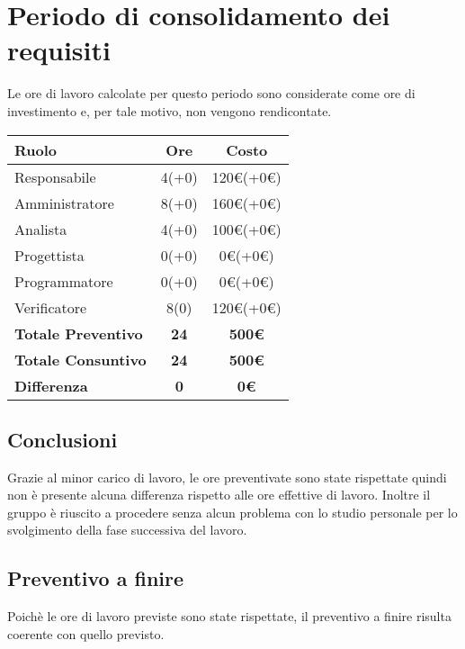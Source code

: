 {\section{Periodo di consolidamento dei requisiti}\label{ConsuntivoPeriodoDiConsolidamentoDeiRequisiti}
Le ore di lavoro calcolate per questo periodo sono considerate come ore di investimento e, per tale motivo, non vengono rendicontate.

\quad
\def\tabularxcolumn#1{m{#1}}
{
	\begin{center}
		\renewcommand{\arraystretch}{1.4}
		\begin{tabularx}{10cm}{|X|c|c|}
			\hline
			\rowcolor{airforceblue}
			\textbf{Ruolo} & \textbf{Ore} & \textbf{Costo}\\
			\hline
			Responsabile & 4(+0) & 120\euro(+0\euro)\\
			\hline
			Amministratore & 8(+0) & 160\euro(+0\euro)\\
			\hline
			Analista & 4(+0) & 100\euro(+0\euro)\\
			\hline
			Progettista & 0(+0) & 0\euro(+0\euro)\\
			\hline
			Programmatore & 0(+0) & 0\euro(+0\euro)\\
			\hline
			Verificatore & 8(0) & 120\euro(+0\euro)\\
			\hline
			\textbf{Totale Preventivo} & \textbf{24} & \textbf{500\euro}\\
			\hline
			\textbf{Totale Consuntivo} & \textbf{24} & \textbf{500\euro}\\
			\hline
			\textbf{Differenza} & \textbf{0} & \textbf{0\euro}
		\end{tabularx}
	\end{center}

\subsection{Conclusioni}\label{ConsuntivoPeriodoDiConsolidamentoDeiRequisitiConclusioni}
Grazie al minor carico di lavoro, le ore preventivate sono state rispettate quindi non è presente alcuna differenza rispetto alle ore effettive di lavoro. Inoltre il gruppo è riuscito a procedere senza alcun problema con lo studio personale per lo svolgimento della fase successiva del lavoro.

\subsection{Preventivo a finire}\label{ConsuntivoPeriodoDiConsolidamentoDeiRequisitiPreventivoAFinire}
Poichè le ore di lavoro previste sono state rispettate, il preventivo a finire risulta coerente con quello previsto.

}}

